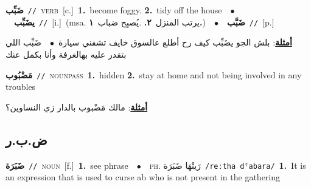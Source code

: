 \documentclass[10pt,a4paper,twoside]{article} %
\begin{document}
\begin{multicols}{2}
{{\setlength\topsep{0pt}\textbf{\foreignlanguage{arabic}{ضَبِّب}}\ {\color{gray}\texttt{//}\color{black}}\ \textsc{verb}\ [c.]\ \textbf{1.}~become foggy.  \textbf{2.}~tidy off the house\ \ $\bullet$\ \ \setlength\topsep{0pt}\textbf{\foreignlanguage{arabic}{يضَبِّب}}\ {\color{gray}\texttt{//}\color{black}}\ [i.]\ \color{gray}(msa. \foreignlanguage{arabic}{يرتب المنزل}~\foreignlanguage{arabic}{\textbf{٢.}}  .\foreignlanguage{arabic}{يُصبِح ضباب}~\foreignlanguage{arabic}{\textbf{١.}})\color{black}\ \ $\bullet$\ \ \setlength\topsep{0pt}\textbf{\foreignlanguage{arabic}{ضَبَّب}}\ {\color{gray}\texttt{//}\color{black}}\ [p.]\  \begin{flushright}\color{gray}\foreignlanguage{arabic}{\textbf{\underline{\foreignlanguage{arabic}{أمثلة}}}: بلش الجو يضَبِّب كيف رح أطلع عالسوق خايف تشفني سيارة\ $\bullet$\ \  ضَبِّب اللي بتقدر عليه بهالغرفة وأنا بكمل عنك}\end{flushright}\color{black}} \vspace{2mm}

{\setlength\topsep{0pt}\textbf{\foreignlanguage{arabic}{مَضْبُوب}}\ {\color{gray}\texttt{//}\color{black}}\ \textsc{noun\textunderscore pass}\ \textbf{1.}~hidden  \textbf{2.}~stay at home and not being involved in any troubles\  \begin{flushright}\color{gray}\foreignlanguage{arabic}{\textbf{\underline{\foreignlanguage{arabic}{أمثلة}}}: مالك مَضْبوب بالدار زي النساوين؟}\end{flushright}\color{black}} \vspace{2mm}

\vspace{-3mm}
\subsection*{\color{blue}\foreignlanguage{arabic}{ض.ب.ر}\color{blue}{}} 

{\setlength\topsep{0pt}\textbf{\foreignlanguage{arabic}{ضَبَرَة}}\ {\color{gray}\texttt{//}\color{black}}\ \textsc{noun}\ [f.]\ \textbf{1.}~see phrase\ \ $\bullet$\ \ \textsc{ph.} \color{gray} \foreignlanguage{arabic}{رَيتْهَا ضَبَرَة}\color{black}\ {\color{gray}\texttt{/{\sffamily reːtha dˤabara}/}\color{black}}\ \textbf{1.}~It is an expression that is used to curse ab who is not present in the gathering\ 

}}
\end{multicols}
\end{document}
